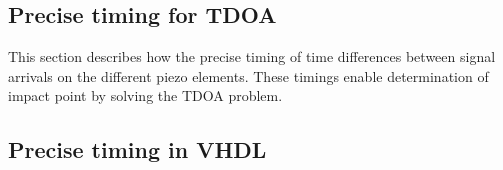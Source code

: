 \subsection{Precise timing for TDOA}
\label{precice_timing}
This section describes how the precise timing of time differences between signal arrivals on the different piezo elements. These timings enable determination of impact point by solving the TDOA problem.

\subsection{Precise timing in VHDL}
